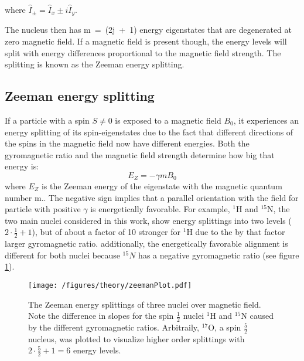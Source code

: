             where $ \hat{I}_\pm = \hat{I}_x\pm i \hat{I}_y$.

        The nucleus then has m~=~(2j~+~1) energy eigenstates that are degenerated at zero magnetic field. If a magnetic field is present though, the energy levels will split with energy differences proportional to the magnetic field strength. The splitting is known as the Zeeman energy splitting.
        \subsection{Zeeman energy splitting}
            If a particle with a spin $S\neq 0$ is exposed to a magnetic field $B_0$, it experiences an energy splitting of its spin-eigenstates due to the fact that different directions of the spins in the magnetic field now have different energies. Both the gyromagnetic ratio and the magnetic field strength determine how big that energy is:
            \begin{equation}
                E_{Z} = -\gamma m B_0
            \end{equation}
            where $E_Z$ is the Zeeman energy of the eigenstate with the magnetic quantum number m.\cite{gerlach_experimentelle_1989, bloch_nuclear_1946}. The negative sign implies that a parallel orientation with the field for particle with positive $\gamma$ is energetically favorable. For example, $^1$H and $^{15}$N, the two main nuclei considered in this work, show energy splittings into two levels ($2\cdot\tfrac{1}{2}+1$), but of about a factor of 10 stronger for $^1$H due to the by that factor larger gyromagnetic ratio. additionally, the energetically favorable alignment is different for both nuclei because $^{15}N$ has a negative gyromagnetic ratio (see figure \ref{figure:theory:zeemanSplittings}).
            \begin{figure}
                \centering
                \texttt{[image: /figures/theory/zeemanPlot.pdf]}
                \caption[Zeeman energy splitting]{The Zeeman energy splittings of three nuclei over magnetic field. Note the difference in slopes for the spin $\tfrac{1}{2}$ nuclei $^1$H and $^{15}$N caused by the different gyromagnetic ratios. Arbitraily, $^{17}$O, a spin $\tfrac{5}{2}$ nucleus, was plotted to visualize higher order splittings with $2 \cdot\tfrac{5}{2}+1 = 6$ energy levels. }
                \label{figure:theory:zeemanSplittings}
            \end{figure}

